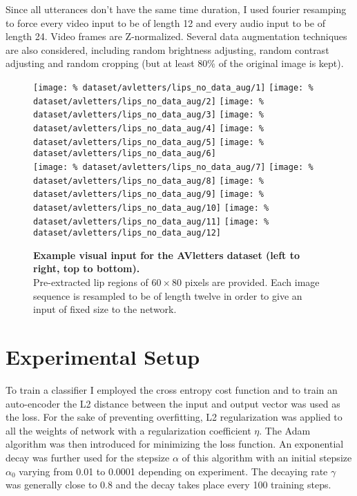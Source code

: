 Since all utterances don't have the same time duration, I used
fourier resamping to force every video input to be of length 12 and
every audio input to be of length 24. Video frames are Z-normalized.
Several data augmentation techniques
are also considered, including random brightness adjusting, random contrast
adjusting and random cropping (but at least 80\% of the original image
is kept).

\begin{figure}[H]
  \centering
  \texttt{[image: \%
    dataset/avletters/lips\_no\_data\_aug/1]}
  \texttt{[image: \%
    dataset/avletters/lips\_no\_data\_aug/2]}
  \texttt{[image: \%
    dataset/avletters/lips\_no\_data\_aug/3]}
  \texttt{[image: \%
    dataset/avletters/lips\_no\_data\_aug/4]}
  \texttt{[image: \%
    dataset/avletters/lips\_no\_data\_aug/5]}
  \texttt{[image: \%
    dataset/avletters/lips\_no\_data\_aug/6]}\\[0.15em]
  \texttt{[image: \%
    dataset/avletters/lips\_no\_data\_aug/7]}
  \texttt{[image: \%
    dataset/avletters/lips\_no\_data\_aug/8]}
  \texttt{[image: \%
    dataset/avletters/lips\_no\_data\_aug/9]}
  \texttt{[image: \%
    dataset/avletters/lips\_no\_data\_aug/10]}
  \texttt{[image: \%
    dataset/avletters/lips\_no\_data\_aug/11]}
  \texttt{[image: \%
    dataset/avletters/lips\_no\_data\_aug/12]}
  \caption{%
    \textbf{Example visual input for the AVletters dataset
      (left to right, top to bottom).}\\[0.1em]
    Pre-extracted lip regions of $60 \times 80$ pixels are provided.
      Each image sequence is resampled to be of length twelve in order to
      give an input of fixed size to the network.}
  \label{fig:avletters_exs}
\end{figure}

\section{Experimental Setup} \label{section:exp}

To train a classifier I employed the cross entropy cost function and to
train an auto-encoder the L2 distance between the input and output vector
was used as the loss. For the sake of preventing overfitting, L2
regularization \cite{Y. Bengio 2012} was applied to all the weights of
network with a regularization coefficient $\eta$.
The Adam algorithm \cite{D. Kingma 2014}
was then introduced for minimizing the loss function.
An exponential decay was further used for the stepsize $\alpha$ of this
algorithm with an initial stepsize $\alpha_0$ varying from 0.01 to 0.0001
depending on experiment. The decaying rate $\gamma$
was generally close to 0.8 and
the decay takes place every 100 training steps.

